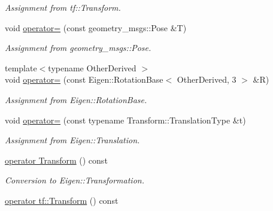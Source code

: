 \begin{DoxyCompactItemize}
\begin{DoxyCompactList}\small\item\em Assignment from tf\+::\+Transform. \end{DoxyCompactList}\item 
void \hyperlink{classow__core_1_1CartesianPosition_af191c6fbdd039462c5be22192bf2ad33}{operator=} (const geometry\+\_\+msgs\+::\+Pose \&T)\hypertarget{classow__core_1_1CartesianPosition_af191c6fbdd039462c5be22192bf2ad33}{}\label{classow__core_1_1CartesianPosition_af191c6fbdd039462c5be22192bf2ad33}

\begin{DoxyCompactList}\small\item\em Assignment from geometry\+\_\+msgs\+::\+Pose. \end{DoxyCompactList}\item 
{\footnotesize template$<$typename Other\+Derived $>$ }\\void \hyperlink{classow__core_1_1CartesianPosition_affc06373565107ca4fc0df32bf8092c9}{operator=} (const Eigen\+::\+Rotation\+Base$<$ Other\+Derived, 3 $>$ \&R)\hypertarget{classow__core_1_1CartesianPosition_affc06373565107ca4fc0df32bf8092c9}{}\label{classow__core_1_1CartesianPosition_affc06373565107ca4fc0df32bf8092c9}

\begin{DoxyCompactList}\small\item\em Assignment from Eigen\+::\+Rotation\+Base. \end{DoxyCompactList}\item 
void \hyperlink{classow__core_1_1CartesianPosition_ae712894313ad56e5f7aef7cdeff80cc4}{operator=} (const typename Transform\+::\+Translation\+Type \&t)\hypertarget{classow__core_1_1CartesianPosition_ae712894313ad56e5f7aef7cdeff80cc4}{}\label{classow__core_1_1CartesianPosition_ae712894313ad56e5f7aef7cdeff80cc4}

\begin{DoxyCompactList}\small\item\em Assignment from Eigen\+::\+Translation. \end{DoxyCompactList}\item 
\hyperlink{classow__core_1_1CartesianPosition_afbf5dc4ca9164db7474b11c04167f839}{operator Transform} () const \hypertarget{classow__core_1_1CartesianPosition_afbf5dc4ca9164db7474b11c04167f839}{}\label{classow__core_1_1CartesianPosition_afbf5dc4ca9164db7474b11c04167f839}

\begin{DoxyCompactList}\small\item\em Conversion to Eigen\+::\+Transformation. \end{DoxyCompactList}\item 
\hyperlink{classow__core_1_1CartesianPosition_a211d6a1c4da4205d0a5cfbbb1adb88e9}{operator tf\+::\+Transform} () const \hypertarget{classow__core_1_1CartesianPosition_a211d6a1c4da4205d0a5cfbbb1adb88e9}{}\label{classow__core_1_1CartesianPosition_a211d6a1c4da4205d0a5cfbbb1adb88e9}


\end{DoxyCompactItemize}
